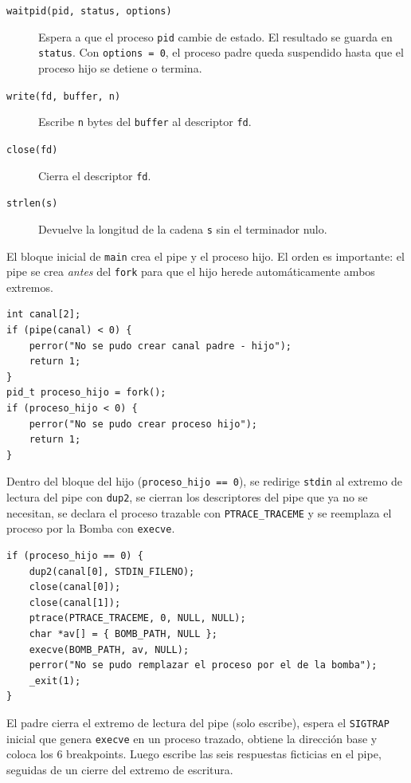 \documentclass[10pt,a4paper]{article}
\begin{document}
\begin{description}
    \item[\texttt{waitpid(pid, status, options)}] Espera a que el proceso \texttt{pid} cambie de estado. El resultado se guarda en \texttt{status}. Con \texttt{options = 0}, el proceso padre queda suspendido hasta que el proceso hijo se detiene o termina.
    \item[\texttt{write(fd, buffer, n)}] Escribe \texttt{n} bytes del \texttt{buffer} al descriptor \texttt{fd}.
    \item[\texttt{close(fd)}] Cierra el descriptor \texttt{fd}.
    \item[\texttt{strlen(s)}] Devuelve la longitud de la cadena \texttt{s} sin el terminador nulo.
\end{description}

El bloque inicial de \texttt{main} crea el pipe y el proceso hijo. El orden es importante: el pipe se crea \emph{antes} del \texttt{fork} para que el hijo herede automáticamente ambos extremos.

\begin{lstlisting}[style=cstyle, caption={Creacion del pipe y del proceso hijo}]
int canal[2];
if (pipe(canal) < 0) {
    perror("No se pudo crear canal padre - hijo");
    return 1;
}
pid_t proceso_hijo = fork();
if (proceso_hijo < 0) {
    perror("No se pudo crear proceso hijo");
    return 1;
}
\end{lstlisting}

Dentro del bloque del hijo (\texttt{proceso\_hijo == 0}), se redirige \texttt{stdin} al extremo de lectura del pipe con \texttt{dup2}, se cierran los descriptores del pipe que ya no se necesitan, se declara el proceso trazable con \texttt{PTRACE\_TRACEME} y se reemplaza el proceso por la Bomba con \texttt{execve}.

\begin{lstlisting}[style=cstyle, caption={Bloque del proceso hijo}]
if (proceso_hijo == 0) {
    dup2(canal[0], STDIN_FILENO);
    close(canal[0]);
    close(canal[1]);
    ptrace(PTRACE_TRACEME, 0, NULL, NULL);
    char *av[] = { BOMB_PATH, NULL };
    execve(BOMB_PATH, av, NULL);
    perror("No se pudo remplazar el proceso por el de la bomba");
    _exit(1);
}
\end{lstlisting}

El padre cierra el extremo de lectura del pipe (solo escribe), espera el \texttt{SIGTRAP} inicial que genera \texttt{execve} en un proceso trazado, obtiene la dirección base y coloca los 6 breakpoints. Luego escribe las seis respuestas ficticias en el pipe, seguidas de un cierre del extremo de escritura.
\end{document}

